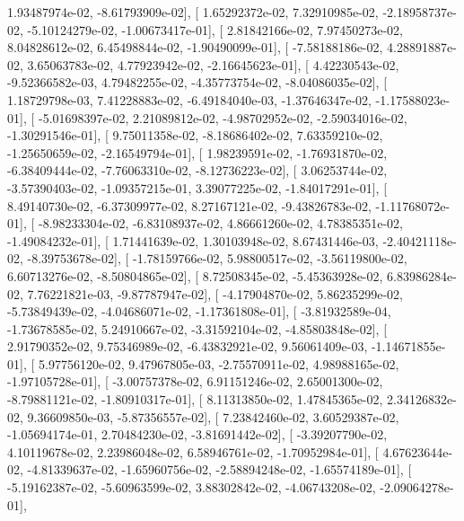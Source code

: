 \documentclass{article}
\begin{document}
          1.93487974e-02,  -8.61793909e-02],
       [  1.65292372e-02,   7.32910985e-02,  -2.18958737e-02,
         -5.10124279e-02,  -1.00673417e-01],
       [  2.81842166e-02,   7.97450273e-02,   8.04828612e-02,
          6.45498844e-02,  -1.90490099e-01],
       [ -7.58188186e-02,   4.28891887e-02,   3.65063783e-02,
          4.77923942e-02,  -2.16645623e-01],
       [  4.42230543e-02,  -9.52366582e-03,   4.79482255e-02,
         -4.35773754e-02,  -8.04086035e-02],
       [  1.18729798e-03,   7.41228883e-02,  -6.49184040e-03,
         -1.37646347e-02,  -1.17588023e-01],
       [ -5.01698397e-02,   2.21089812e-02,  -4.98702952e-02,
         -2.59034016e-02,  -1.30291546e-01],
       [  9.75011358e-02,  -8.18686402e-02,   7.63359210e-02,
         -1.25650659e-02,  -2.16549794e-01],
       [  1.98239591e-02,  -1.76931870e-02,  -6.38409444e-02,
         -7.76063310e-02,  -8.12736223e-02],
       [  3.06253744e-02,  -3.57390403e-02,  -1.09357215e-01,
          3.39077225e-02,  -1.84017291e-01],
       [  8.49140730e-02,  -6.37309977e-02,   8.27167121e-02,
         -9.43826783e-02,  -1.11768072e-01],
       [ -8.98233304e-02,  -6.83108937e-02,   4.86661260e-02,
          4.78385351e-02,  -1.49084232e-01],
       [  1.71441639e-02,   1.30103948e-02,   8.67431446e-03,
         -2.40421118e-02,  -8.39753678e-02],
       [ -1.78159766e-02,   5.98800517e-02,  -3.56119800e-02,
          6.60713276e-02,  -8.50804865e-02],
       [  8.72508345e-02,  -5.45363928e-02,   6.83986284e-02,
          7.76221821e-03,  -9.87787947e-02],
       [ -4.17904870e-02,   5.86235299e-02,  -5.73849439e-02,
         -4.04686071e-02,  -1.17361808e-01],
       [ -3.81932589e-04,  -1.73678585e-02,   5.24910667e-02,
         -3.31592104e-02,  -4.85803848e-02],
       [  2.91790352e-02,   9.75346989e-02,  -6.43832921e-02,
          9.56061409e-03,  -1.14671855e-01],
       [  5.97756120e-02,   9.47967805e-03,  -2.75570911e-02,
          4.98988165e-02,  -1.97105728e-01],
       [ -3.00757378e-02,   6.91151246e-02,   2.65001300e-02,
         -8.79881121e-02,  -1.80910317e-01],
       [  8.11313850e-02,   1.47845365e-02,   2.34126832e-02,
          9.36609850e-03,  -5.87356557e-02],
       [  7.23842460e-02,   3.60529387e-02,  -1.05694174e-01,
          2.70484230e-02,  -3.81691442e-02],
       [ -3.39207790e-02,   4.10119678e-02,   2.23986048e-02,
          6.58946761e-02,  -1.70952984e-01],
       [  4.67623644e-02,  -4.81339637e-02,  -1.65960756e-02,
         -2.58894248e-02,  -1.65574189e-01],
       [ -5.19162387e-02,  -5.60963599e-02,   3.88302842e-02,
         -4.06743208e-02,  -2.09064278e-01],
\end{document}
